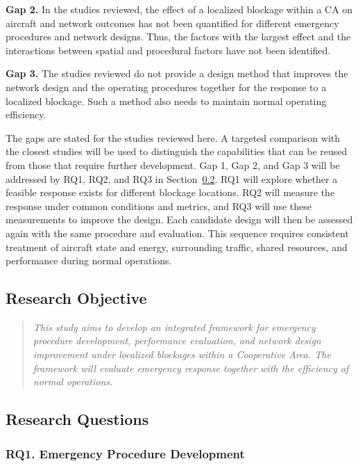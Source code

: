 \documentclass[11pt,letterpaper]{article}
\newcommand{\gap}[2]{\par\noindent\textbf{Gap #1.} #2\par}
\begin{document}
\gap{2}{In the studies reviewed, the effect of a localized blockage within a CA on aircraft and network outcomes has not been quantified for different emergency procedures and network designs. Thus, the factors with the largest effect and the interactions between spatial and procedural factors have not been identified.}

\gap{3}{The studies reviewed do not provide a design method that improves the network design and the operating procedures together for the response to a localized blockage. Such a method also needs to maintain normal operating efficiency.}

The gaps are stated for the studies reviewed here. A targeted comparison with the closest studies will be used to distinguish the capabilities that can be reused from those that require further development. Gap 1, Gap 2, and Gap 3 will be addressed by RQ1, RQ2, and RQ3 in Section~\ref{sec:research-questions}. RQ1 will explore whether a feasible response exists for different blockage locations. RQ2 will measure the response under common conditions and metrics, and RQ3 will use these measurements to improve the design. Each candidate design will then be assessed again with the same procedure and evaluation. This sequence requires consistent treatment of aircraft state and energy, surrounding traffic, shared resources, and performance during normal operations.

\subsection{Research Objective}
\label{sec:research-objective}

\begin{quote}
\textit{This study aims to develop an integrated framework for emergency procedure development, performance evaluation, and network design improvement under localized blockages within a Cooperative Area. The framework will evaluate emergency response together with the efficiency of normal operations.}
\end{quote}

\subsection{Research Questions}
\label{sec:research-questions}

\subsubsection{RQ1. Emergency Procedure Development}
\label{sec:rq1}
\end{document}
